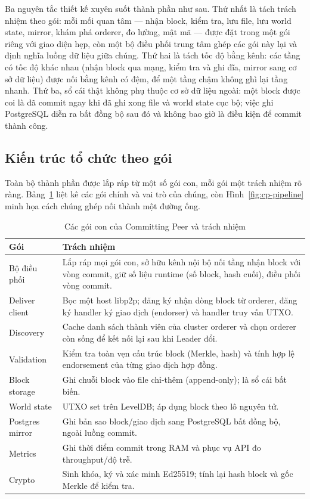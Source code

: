 Ba nguyên tắc thiết kế xuyên suốt thành phần như sau. Thứ nhất là tách trách
nhiệm theo gói: mỗi mối quan tâm --- nhận block, kiểm tra, lưu file, lưu world
state, mirror, khám phá orderer, đo lường, mật mã --- được đặt trong một gói
riêng với giao diện hẹp, còn một bộ điều phối trung tâm ghép các gói này lại
và định nghĩa luồng dữ liệu giữa chúng. Thứ hai là tách tốc độ bằng kênh: các
tầng có tốc độ khác nhau (nhận block qua mạng, kiểm tra và ghi đĩa, mirror
sang cơ sở dữ liệu) được nối bằng kênh có đệm, để một tầng chậm không ghì lại
tầng nhanh. Thứ ba, sổ cái thật không phụ thuộc cơ sở dữ liệu ngoài: một block
được coi là đã commit ngay khi đã ghi xong file và world state cục bộ; việc
ghi PostgreSQL diễn ra bất đồng bộ sau đó và không bao giờ là điều kiện để
commit thành công.

\subsection{Kiến trúc tổ chức theo gói}
\label{sec:cp-architecture}

Toàn bộ thành phần được lắp ráp từ một số gói con, mỗi gói một trách nhiệm rõ
ràng. Bảng~\ref{tab:cp-packages} liệt kê các gói chính và vai trò của chúng,
còn Hình~\ref{fig:cp-pipeline} minh họa cách chúng ghép nối thành một đường
ống.

\begin{table}[H]
\centering
\caption{Các gói con của Committing Peer và trách nhiệm}
\label{tab:cp-packages}
\begin{tabular}{@{}p{3.2cm}p{9.6cm}@{}}
\toprule
Gói & Trách nhiệm \\
\midrule
Bộ điều phối & Lắp ráp mọi gói con, sở hữu kênh nội bộ nối tầng nhận block với vòng commit, giữ số liệu runtime (số block, hash cuối), điều phối vòng commit. \\
Deliver client & Bọc một host libp2p; đăng ký nhận dòng block từ orderer, đăng ký handler ký giao dịch (endorser) và handler truy vấn UTXO. \\
Discovery & Cache danh sách thành viên của cluster orderer và chọn orderer còn sống để kết nối lại sau khi Leader đổi. \\
Validation & Kiểm tra toàn vẹn cấu trúc block (Merkle, hash) và tính hợp lệ endorsement của từng giao dịch hợp đồng. \\
Block storage & Ghi chuỗi block vào file chỉ-thêm (append-only); là sổ cái bất biến. \\
World state & UTXO set trên LevelDB; áp dụng block theo lô nguyên tử. \\
Postgres mirror & Ghi bản sao block/giao dịch sang PostgreSQL bất đồng bộ, ngoài luồng commit. \\
Metrics & Ghi thời điểm commit trong RAM và phục vụ API đo throughput/độ trễ. \\
Crypto & Sinh khóa, ký và xác minh Ed25519; tính lại hash block và gốc Merkle để kiểm tra. \\
\bottomrule
\end{tabular}
\end{table}

